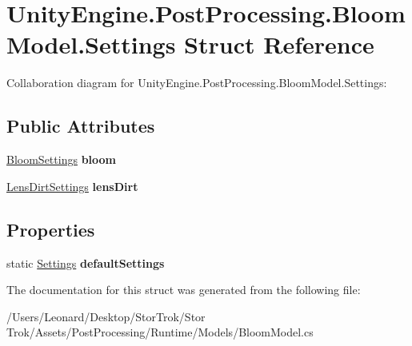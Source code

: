 \hypertarget{struct_unity_engine_1_1_post_processing_1_1_bloom_model_1_1_settings}{}\section{Unity\+Engine.\+Post\+Processing.\+Bloom\+Model.\+Settings Struct Reference}
\label{struct_unity_engine_1_1_post_processing_1_1_bloom_model_1_1_settings}


Collaboration diagram for Unity\+Engine.\+Post\+Processing.\+Bloom\+Model.\+Settings\+:
\subsection*{Public Attributes}
\begin{DoxyCompactItemize}
\item 
\mbox{\label{struct_unity_engine_1_1_post_processing_1_1_bloom_model_1_1_settings_a67ea8696d631446369685adfd283cc6a}} 
\hyperlink{struct_unity_engine_1_1_post_processing_1_1_bloom_model_1_1_bloom_settings}{Bloom\+Settings} {\bfseries bloom}
\item 
\mbox{\label{struct_unity_engine_1_1_post_processing_1_1_bloom_model_1_1_settings_a5da17f7be340ea4ea3b7bcde312d5953}} 
\hyperlink{struct_unity_engine_1_1_post_processing_1_1_bloom_model_1_1_lens_dirt_settings}{Lens\+Dirt\+Settings} {\bfseries lens\+Dirt}
\end{DoxyCompactItemize}
\subsection*{Properties}
\begin{DoxyCompactItemize}
\item 
\mbox{\label{struct_unity_engine_1_1_post_processing_1_1_bloom_model_1_1_settings_a97ac6c2e2540e9df3929e0fc0d754aa7}} 
static \hyperlink{struct_unity_engine_1_1_post_processing_1_1_bloom_model_1_1_settings}{Settings} {\bfseries default\+Settings}
\end{DoxyCompactItemize}


The documentation for this struct was generated from the following file\+:\begin{DoxyCompactItemize}
\item 
/\+Users/\+Leonard/\+Desktop/\+Stor\+Trok/\+Stor Trok/\+Assets/\+Post\+Processing/\+Runtime/\+Models/Bloom\+Model.\+cs\end{DoxyCompactItemize}
